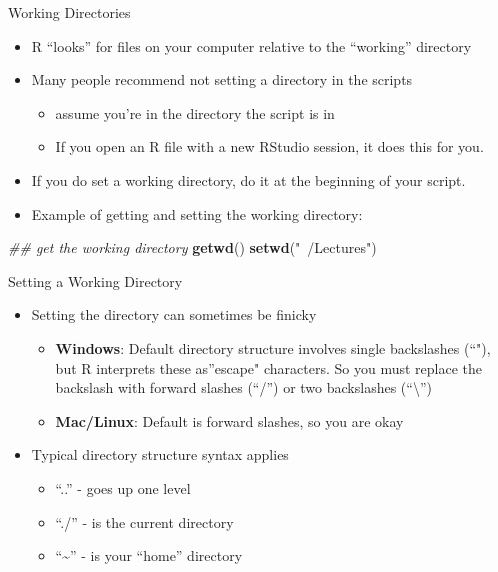 \documentclass[
  ignorenonframetext,
]{beamer}
\newenvironment{Shaded}{\begin{snugshade}}{\end{snugshade}}
\newcommand{\CommentTok}[1]{\textcolor[rgb]{0.56,0.35,0.01}{\textit{#1}}}
\newcommand{\KeywordTok}[1]{\textcolor[rgb]{0.13,0.29,0.53}{\textbf{#1}}}
\newcommand{\NormalTok}[1]{#1}
\newcommand{\StringTok}[1]{\textcolor[rgb]{0.31,0.60,0.02}{#1}}
\providecommand{\tightlist}{%
  \setlength{\itemsep}{0pt}\setlength{\parskip}{0pt}}
\begin{document}
\begin{frame}[fragile]{Working Directories}
\protect\hypertarget{working-directories}{}

\begin{itemize}
\tightlist
\item
  R ``looks'' for files on your computer relative to the ``working''
  directory
\item
  Many people recommend not setting a directory in the scripts

  \begin{itemize}
  \tightlist
  \item
    assume you're in the directory the script is in
  \item
    If you open an R file with a new RStudio session, it does this for
    you.
  \end{itemize}
\item
  If you do set a working directory, do it at the beginning of your
  script.
\item
  Example of getting and setting the working directory:
\end{itemize}

\begin{Shaded}
\begin{Highlighting}[]
\CommentTok{## get the working directory}
\KeywordTok{getwd}\NormalTok{()}
\KeywordTok{setwd}\NormalTok{(}\StringTok{"~/Lectures"}\NormalTok{) }
\end{Highlighting}
\end{Shaded}

\end{frame}

\begin{frame}{Setting a Working Directory}
\protect\hypertarget{setting-a-working-directory}{}

\begin{itemize}
\tightlist
\item
  Setting the directory can sometimes be finicky

  \begin{itemize}
  \tightlist
  \item
    \textbf{Windows}: Default directory structure involves single
    backslashes (``"), but R interprets these as''escape" characters. So
    you must replace the backslash with forward slashes (``/'') or two
    backslashes (``\textbackslash{}'')
  \item
    \textbf{Mac/Linux}: Default is forward slashes, so you are okay
  \end{itemize}
\item
  Typical directory structure syntax applies

  \begin{itemize}
  \tightlist
  \item
    ``..'' - goes up one level
  \item
    ``./'' - is the current directory
  \item
    ``\textasciitilde{}'' - is your ``home'' directory
  \end{itemize}
\end{itemize}

\end{frame}
\end{document}
